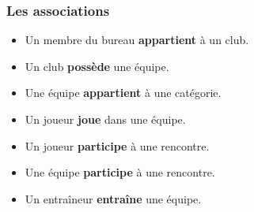 \documentclass{article}
\begin{document}
\subsubsection*{Les associations}
\begin {itemize}
\item Un membre du bureau \textbf{appartient} à un club. \\

\item Un club \textbf{possède} une équipe. \\

\item Une équipe \textbf{appartient} à une catégorie. \\

\item Un joueur \textbf{joue} dans une équipe. \\

\item Un joueur \textbf{participe} à une rencontre. \\

\item Une équipe \textbf{participe} à une rencontre. \\

\item Un entraîneur \textbf{entraîne} une équipe. \\

\end{itemize}
\end{document}
